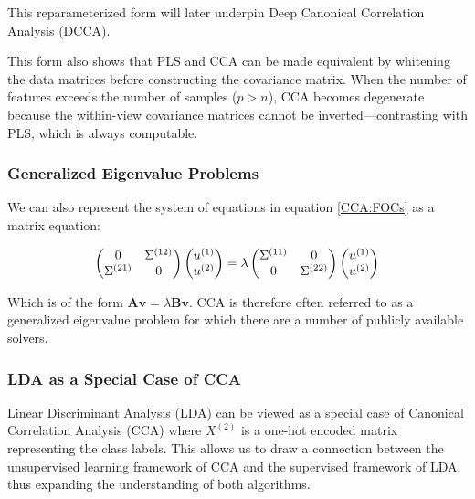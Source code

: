 This reparameterized form will later underpin Deep Canonical Correlation Analysis (DCCA).

This form also shows that PLS and CCA can be made equivalent by whitening the data matrices before constructing the covariance matrix. When the number of features exceeds the number of samples (\(p>n\)), CCA becomes degenerate because the within-view covariance matrices cannot be inverted—contrasting with PLS, which is always computable.

\subsubsection{Generalized Eigenvalue Problems}

We can also represent the system of equations in equation \ref{CCA:FOCs} as a matrix equation:

\begin{align}
    \begin{pmatrix}
        0                    & \Sigma^{(12)} \\
        \Sigma^{(21)} & 0
    \end{pmatrix}
    \begin{pmatrix}
        u^{(1)} \\
        u^{(2)}
    \end{pmatrix}
    =
    \lambda
    \begin{pmatrix}
        \Sigma^{(11)} & 0 \\
        0                    & \Sigma^{(22)}
    \end{pmatrix}
    \begin{pmatrix}
        u^{(1)} \\
        u^{(2)}
    \end{pmatrix}
\end{align}

Which is of the form $\mathbf{A v} = \lambda \mathbf{B v}$. CCA is therefore often referred to as a generalized eigenvalue problem for which there are a number of publicly available solvers.

\subsubsection{LDA as a Special Case of CCA}

Linear Discriminant Analysis (LDA) can be viewed as a special case of Canonical Correlation Analysis (CCA) where \(X^{(2)}\) is a one-hot encoded matrix representing the class labels. This allows us to draw a connection between the unsupervised learning framework of CCA and the supervised framework of LDA, thus expanding the understanding of both algorithms.

